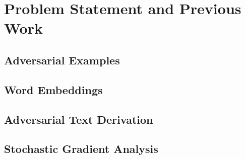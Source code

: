 \chapter{Problem Statement and Previous Work}
\section{Adversarial Examples}

\section{Word Embeddings}

\section{Adversarial Text Derivation}

\section{Stochastic Gradient Analysis}

